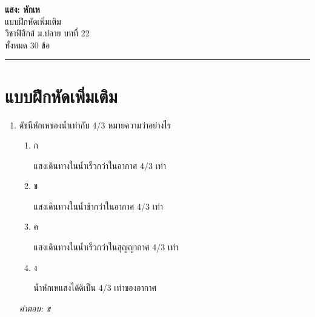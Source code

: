 \documentclass[12pt]{article}
\begin{document}
\begin{center}
{\Large\textbf{แสง: หักเห}}\\[6pt]
{\normalsize แบบฝึกหัดเพิ่มเติม}\\[6pt]
{\normalsize วิชาฟิสิกส์ ม.ปลาย บทที่ 22}\\[4pt]
{\footnotesize ทั้งหมด 30 ข้อ}
\end{center}
\hrule
\bigskip

\section*{แบบฝึกหัดเพิ่มเติม}
\begin{enumerate}[label=\arabic*., itemsep=0.5\baselineskip, topsep=0.5\baselineskip, leftmargin=*]
\item ดัชนีหักเหของน้ำเท่ากับ 4/3 หมายความว่าอย่างไร
\begin{enumerate}[label=\alph*)., itemsep=0.3\baselineskip, topsep=0.3\baselineskip]
\item ก\ 
\begin{minipage}[t]{0.9\linewidth}
\raggedright แสงเดินทางในน้ำเร็วกว่าในอากาศ 4/3 เท่า
\end{minipage}
\item ข\ 
\begin{minipage}[t]{0.9\linewidth}
\raggedright แสงเดินทางในน้ำช้ากว่าในอากาศ 4/3 เท่า
\end{minipage}
\item ค\ 
\begin{minipage}[t]{0.9\linewidth}
\raggedright แสงเดินทางในน้ำเร็วกว่าในสุญญากาศ 4/3 เท่า
\end{minipage}
\item ง\ 
\begin{minipage}[t]{0.9\linewidth}
\raggedright น้ำหักเหแสงได้ดีเป็น 4/3 เท่าของอากาศ
\end{minipage}
\end{enumerate}
\vspace{-0.3\baselineskip}
\begin{small}
\textit{คำตอบ: ข}
\end{small}


\end{enumerate}
\end{document}
